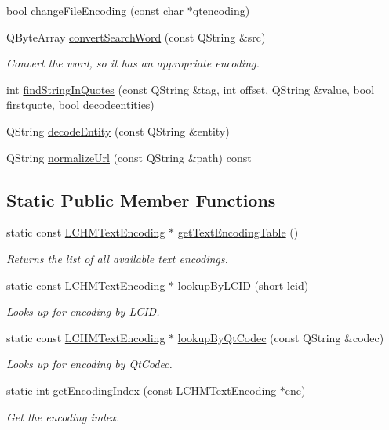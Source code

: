 \begin{DoxyCompactItemize}
bool \hyperlink{classLCHMFileImpl_a4b9bc32e0bc5cedb20fc851503e7a1ab}{change\+File\+Encoding} (const char $\ast$qtencoding)
\item 
Q\+Byte\+Array \hyperlink{classLCHMFileImpl_af271c732dfabab23d3d9a3aea235b983}{convert\+Search\+Word} (const Q\+String \&src)
\begin{DoxyCompactList}\small\item\em Convert the word, so it has an appropriate encoding. \end{DoxyCompactList}\item 
int \hyperlink{classLCHMFileImpl_a4682910033121f594c7619b92a55af54}{find\+String\+In\+Quotes} (const Q\+String \&tag, int offset, Q\+String \&value, bool firstquote, bool decodeentities)
\item 
Q\+String \hyperlink{classLCHMFileImpl_ae88fabdc1dc765e88588fab616e7bdb1}{decode\+Entity} (const Q\+String \&entity)
\item 
Q\+String \hyperlink{classLCHMFileImpl_abdb0cfe83119a89df45ef681e2548b17}{normalize\+Url} (const Q\+String \&path) const 
\end{DoxyCompactItemize}
\subsection*{Static Public Member Functions}
\begin{DoxyCompactItemize}
\item 
static const \hyperlink{structLCHMTextEncoding}{L\+C\+H\+M\+Text\+Encoding} $\ast$ \hyperlink{classLCHMFileImpl_a0f6652702449e038b03be6b4264a9f44}{get\+Text\+Encoding\+Table} ()
\begin{DoxyCompactList}\small\item\em Returns the list of all available text encodings. \end{DoxyCompactList}\item 
static const \hyperlink{structLCHMTextEncoding}{L\+C\+H\+M\+Text\+Encoding} $\ast$ \hyperlink{classLCHMFileImpl_af4a32113ec9d09e7d49f3cbf44134443}{lookup\+By\+L\+C\+I\+D} (short lcid)
\begin{DoxyCompactList}\small\item\em Looks up for encoding by L\+C\+I\+D. \end{DoxyCompactList}\item 
static const \hyperlink{structLCHMTextEncoding}{L\+C\+H\+M\+Text\+Encoding} $\ast$ \hyperlink{classLCHMFileImpl_aac2d1a35019067cd0739d038eecd9b9e}{lookup\+By\+Qt\+Codec} (const Q\+String \&codec)
\begin{DoxyCompactList}\small\item\em Looks up for encoding by Qt\+Codec. \end{DoxyCompactList}\item 
static int \hyperlink{classLCHMFileImpl_adcd0050ac69551a03e53215264820b74}{get\+Encoding\+Index} (const \hyperlink{structLCHMTextEncoding}{L\+C\+H\+M\+Text\+Encoding} $\ast$enc)
\begin{DoxyCompactList}\small\item\em Get the encoding index. \end{DoxyCompactList}\end{DoxyCompactItemize}

